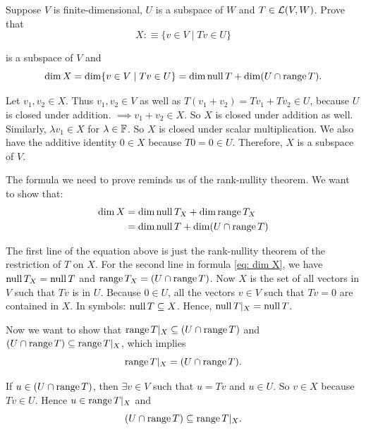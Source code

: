 \begin{xrcs}
  Suppose $V$ is finite-dimensional, $U$ is a subspace of $W$ and $T \in \mathcal{L} (V,W)$. Prove that
  \begin{equation}
    X :\equiv \{v  \in V \mid Tv \in U \}
  \end{equation}

  is a subspace of $V$ and
  \begin{equation}
    \dim X = \dim \{v \in V \mid Tv \in U \} = \dim \operatorname{null} T + \dim (U \cap \operatorname{range} T).
  \end{equation}

  \begin{xprf}
    Let $v_1, v_2 \in X$. Thus $v_1, v_2 \in V$ as well as $T(v_1 + v_2) = T v_1 + T v_2 \in U$, because $U$ is closed under addition. $\implies v_1 + v_2 \in X$. So $X$ is closed under addition as well. Similarly, $\lambda v_1 \in X$ for $\lambda \in \mathbb{F}$. So $X$ is closed under scalar multiplication. We also have the additive identity $0 \in X$ because $T0=0\in U$. Therefore, $X$ is a subspace of $V$.

    The formula we need to prove reminds us of the rank-nullity theorem. We want to show that:
    \begin{equation}
      \label{eq: dim X}
      \begin{aligned}
        \dim X &= \dim \operatorname{null} T_X + \dim \operatorname{range} T_X \\
        &= \dim \operatorname{null} T + \dim (U \cap \operatorname{range} T)
      \end{aligned}
    \end{equation}

    The first line of the equation above is just the rank-nullity theorem of the restriction of $T$ on $X$. For the second line in formula \eqref{eq: dim X}, we have $\operatorname{null} T_X = \operatorname{null} T$ and
    $\operatorname{range} T_X = (U \cap \operatorname{range} T)$. Now $X$ is the set of all vectors in $V$ such that $Tv$ is in $U$. Because $0 \in U$, all the vectors $v \in V$ such that $Tv=0$ are contained in $X$. In symbols: $\operatorname{null} T \subseteq X$. Hence, $\operatorname{null} T|_X = \operatorname{null} T$.

    Now we want to show that $\operatorname{range} T|_X \subseteq (U \cap \operatorname{range} T)$ and $(U \cap \operatorname{range} T) \subseteq \operatorname{range} T|_X$, which implies
    \begin{equation}
      \operatorname{range} T|_X = (U \cap \operatorname{range} T).
    \end{equation}

    If $u \in (U \cap \operatorname{range} T)$, then $\exists v \in V$ such that $u=Tv$ and $u \in U$. So $v \in X$ because $Tv \in U$. Hence $u \in \operatorname{range} T|_X$ and
    \begin{equation}
      (U \cap \operatorname{range} T) \subseteq \operatorname{range} T|_X.
    \end{equation}


\end{xprf}
\end{xrcs}
